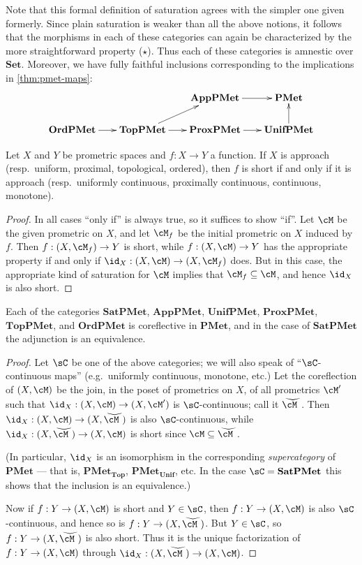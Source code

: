 \documentclass{article}
\def\sat#1{\widecheck{#1}}
\def\Set{\mathbf{Set}}
\def\PMet{\mathbf{PMet}}
\def\PMetTop{\mathbf{PMet}_{\mathbf{Top}}}
\def\PMetUnif{\mathbf{PMet}_{\mathbf{Unif}}}
\def\TopPMet{\mathbf{TopPMet}}
\def\UnifPMet{\mathbf{UnifPMet}}
\def\ProxPMet{\mathbf{ProxPMet}}
\def\AppPMet{\mathbf{AppPMet}}
\def\OrdPMet{\mathbf{OrdPMet}}
\def\SatPMet{\mathbf{SatPMet}}
\begin{document}
Note that this formal definition of saturation agrees with the simpler one given formerly.
Since plain saturation is weaker than all the above notions, it follows that the morphisms in each of these categories can again be characterized by the more straightforward property ($\star$).
Thus each of these categories is amnestic over $\Set$.
Moreover, we have fully faithful inclusions corresponding to the implications in \cref{thm:pmet-maps}:
\[
\xymatrix@-.5pc{
  && \AppPMet \ar[r] & \PMet\\
  \OrdPMet \ar[r] &
  \TopPMet \ar[r]\ar[ur] &
  \ProxPMet \ar[r] &
  \UnifPMet \ar[u]
}\]

\begin{thm}
  Let $X$ and $Y$ be prometric spaces and $f:X\to Y$ a function.
  If $X$ is approach (resp.\ uniform, proximal, topological, ordered), then $f$ is short if and only if it is approach (resp.\ uniformly continuous, proximally continuous, continuous, monotone).
\end{thm}
\begin{proof}
  In all cases ``only if'' is always true, so it suffices to show ``if''.
  Let $\cM$ be the given prometric on $X$, and let $\cM_f$ be the initial prometric on $X$ induced by $f$.
  Then $f:(X,\cM_f) \to Y$ is short, while $f:(X,\cM) \to Y$ has the appropriate property if and only if $\id_X:(X,\cM) \to (X,\cM_f)$ does.
  But in this case, the appropriate kind of saturation for $\cM$ implies that $\cM_f \subseteq \cM$, and hence $\id_X$ is also short.
\end{proof}

\begin{thm}
  Each of the categories $\SatPMet$, $\AppPMet$, $\UnifPMet$, $\ProxPMet$, $\TopPMet$, and $\OrdPMet$ is coreflective in $\PMet$, and in the case of $\SatPMet$ the adjunction is an equivalence.
\end{thm}
\begin{proof}
  Let $\sC$ be one of the above categories; we will also speak of ``$\sC$-continuous maps'' (e.g.\ uniformly continuous, monotone, etc.)
  Let the coreflection of $(X,\cM)$ be the join, in the poset of prometrics on $X$, of all prometrics $\cM'$ such that $\id_X :(X,\cM) \to (X,\cM')$ is $\sC$-continuous; call it $\sat{\cM}$.
  Then $\id_X :(X,\cM) \to (X,\sat{\cM})$ is also $\sC$-continuous, while $\id_X : (X,\sat{\cM}) \to (X,\cM)$ is short since $\cM \subseteq \sat{\cM}$.

  (In particular, $\id_X$ is an isomorphism in the corresponding \emph{supercategory} of $\PMet$ --- that is, $\PMetTop$, $\PMetUnif$, etc.
  In the case $\sC=\SatPMet$ this shows that the inclusion is an equivalence.)

  Now if $f:Y\to (X,\cM)$ is short and $Y\in\sC$, then $f:Y\to (X,\cM)$ is also $\sC$-continuous, and hence so is $f:Y\to (X,\sat{\cM})$.
  But $Y\in\sC$, so $f:Y\to (X,\sat{\cM})$ is also short.
  Thus it is the unique factorization of $f:Y\to (X,\cM)$ through $\id_X : (X,\sat{\cM}) \to (X,\cM)$.
\end{proof}
\end{document}

